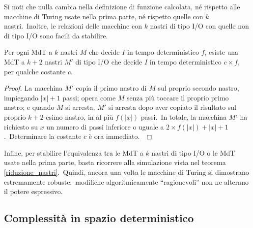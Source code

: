 \noindent Si noti che nulla cambia nella definizione di funzione calcolata, né rispetto alle macchine di Turing usate nella prima parte, né rispetto quelle con $k$ nastri.\
Inoltre, le relazioni delle macchine con $k$ nastri di tipo I/O con quelle non di tipo I/O sono facili da stabilire.\

\begin{property}
    Per ogni MdT a $k$ nastri $M$ che decide $I$ in tempo deterministico $f$, esiste una MdT a $k+2$ nastri $M'$ di tipo I/O che decide $I$ in tempo deterministico $c \times f$, per qualche costante $c$.
\end{property}

\begin{proof}
    La macchina $M'$ copia il primo nastro di $M$ sul proprio secondo nastro, impiegando $|x| + 1$ passi; opera come $M$ senza più toccare il proprio primo nastro; e quando $M$ si arresta, $M'$ si arresta dopo aver copiato il risultato sul proprio $k + 2$-esimo nastro, in al più $f(|x|)$ passi.\
    In totale, la macchina $M'$ ha richiesto su $x$ un numero di passi inferiore o uguale a $2 \times f (|x|) + |x| + 1$.\
    Determinare la costante $c$ è ora immediato.\
\end{proof}

\noindent Infine, per stabilire l'equivalenza tra le MdT a $k$ nastri di tipo I/O o le MdT usate nella prima parte, basta ricorrere alla simulazione vista nel teorema \ref{riduzione_nastri}.\
Quindi, ancora una volta le macchine di Turing si dimostrano estremamente robuste:\ modifiche algoritmicamente ``ragionevoli'' non ne alterano il potere espressivo.

\subsection{Complessità in spazio deterministico}

